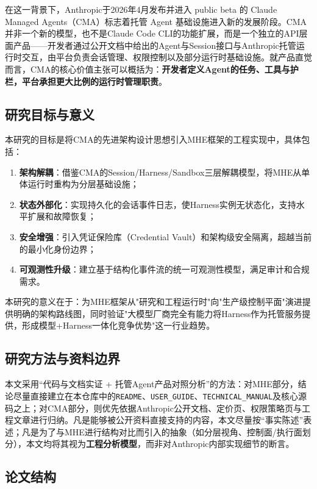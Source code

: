 \documentclass[12pt,a4paper]{ctexart}
\begin{document}
在这一背景下，Anthropic于2026年4月发布并进入 public beta 的 Claude Managed Agents（CMA）标志着托管 Agent 基础设施进入新的发展阶段。CMA并非一个新的模型，也不是Claude Code CLI的功能扩展，而是一个独立的API层面产品——开发者通过公开文档中给出的Agent与Session接口与Anthropic托管运行时交互，由平台负责会话管理、权限控制以及部分运行时基础设施。就产品直觉而言，CMA的核心价值主张可以概括为：\textbf{开发者定义Agent的任务、工具与护栏，平台承担更大比例的运行时管理职责}。

\subsection{研究目标与意义}

本研究的目标是将CMA的先进架构设计思想引入MHE框架的工程实现中，具体包括：

\begin{enumerate}
    \item \textbf{架构解耦}：借鉴CMA的Session/Harness/Sandbox三层解耦模型，将MHE从单体运行时重构为分层基础设施；
    \item \textbf{状态外部化}：实现持久化的会话事件日志，使Harness实例无状态化，支持水平扩展和故障恢复；
    \item \textbf{安全增强}：引入凭证保险库（Credential Vault）和架构级安全隔离，超越当前的最小化身份边界；
    \item \textbf{可观测性升级}：建立基于结构化事件流的统一可观测性模型，满足审计和合规需求。
\end{enumerate}

本研究的意义在于：为MHE框架从"研究和工程运行时"向"生产级控制平面"演进提供明确的架构路线图，同时验证"大模型厂商完全有能力将Harness作为托管服务提供，形成模型+Harness一体化竞争优势"这一行业趋势。

\subsection{研究方法与资料边界}

本文采用“代码与文档实证 + 托管Agent产品对照分析”的方法：对MHE部分，结论尽量直接建立在本仓库中的\texttt{README}、\texttt{USER\_GUIDE}、\texttt{TECHNICAL\_MANUAL}及核心源码之上；对CMA部分，则优先依据Anthropic公开文档、定价页、权限策略页与工程文章进行归纳。凡是能够被公开资料直接支持的内容，本文尽量按“事实陈述”表述；凡是为了与MHE进行结构对比而引入的抽象（如分层视角、控制面/执行面划分），本文均将其视为\textbf{工程分析模型}，而非对Anthropic内部实现细节的断言。

\subsection{论文结构}
\end{document}
